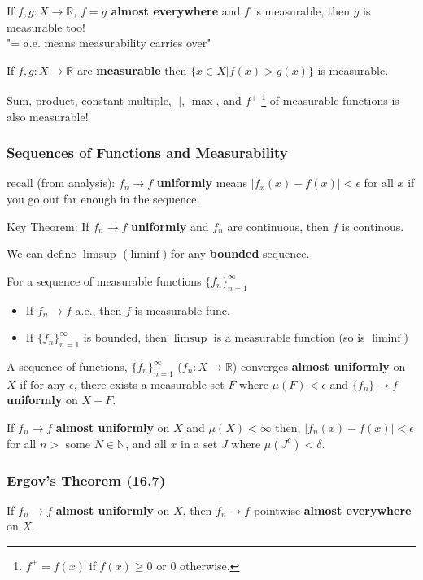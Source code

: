 \documentclass[a4paper, 12pt]{article}
\def\R{\ensuremath{\mathbb{R}}} %
\def\N{\ensuremath{\mathbb{N}}}
\newcommand{\abs}[1]{\left\vert#1\right\vert} %
\newcommand{\bt}[1]{\textbf{#1}} %
\begin{document}
\begin{multicols}{2}
If $f, g: X \rightarrow \R$,
\bt{$f = g$ almost everywhere}
and $f$ is measurable, then
$g$ is measurable too!\\
"= a.e. means measurability carries over"

If $f, g: X \rightarrow \R$ are \bt{measurable} then $\{x \in X | f(x) > g(x)\}$
is measurable.

Sum, product, constant multiple, $||$, $\max$, and $f^+$ 
\footnote{$f^+ = f(x)$ if $f(x) \geq 0$ or $0$ otherwise.
}
of 
measurable functions is also measurable!

\subsubsection{Sequences of Functions and Measurability}
recall (from analysis): $f_n \rightarrow f$ \bt{uniformly} means $|f_x(x) - f(x)| < \epsilon$ for all $x$ if you go out far enough in the sequence.

\begin{mdframed}
Key Theorem: If $f_n \rightarrow f$ \bt{uniformly} and $f_n$ are continuous, 
then $f$ is continous.
\end{mdframed}



We can define $\limsup$ ($\liminf$) for any \bt{bounded} sequence.

For a sequence of measurable functions $\{f_n\}_{n=1}^\infty$
\begin{itemize}
    \item If $f_n \rightarrow f$ a.e., then $f$ is measurable func.
    \item If $\{f_n\}_{n=1}^\infty$ is bounded, then $\limsup$ is a measurable function (so is $\liminf$)
\end{itemize}

A sequence of functions, $\{f_n\}_{n=1}^\infty$ 
($f_n: X \rightarrow \R$) converges 
\bt{almost uniformly} on $X$ if 
for any $\epsilon$, there exists a measurable set $F$ where 
$\mu(F) < \epsilon$ and $\{f_n\} \rightarrow f$ 
\bt{uniformly} on $X-F$.


If $f_n \rightarrow f$ \bt{almost uniformly} on $X$ and $\mu(X) < \infty$
then, $\abs{f_n(x) - f(x)} < \epsilon$ for all $n > $ some $N \in \N$, 
and all $x$ in a set $J$ where $\mu(J^c) < \delta$.


\subsubsection{Ergov's Theorem (16.7)}
If $f_n \rightarrow f$ \bt{almost uniformly} on $X$, 
then $f_n \rightarrow f$ pointwise \bt{almost everywhere} on $X$.


\end{multicols}
\end{document}

